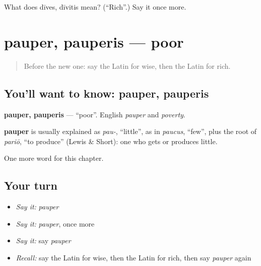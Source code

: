\begin{tcolorbox}[breakable,colback=teal!4,colframe=teal!35!black,title={Before you move on}]
What does dīves, dīvitis mean? (\textquotedblleft{}Rich\textquotedblright{}.) Say it once more.
\end{tcolorbox}
\section[pauper, pauperis]{pauper, pauperis — poor}

\label{lesson:LA-C98-pauper}



\begin{quote}
Before the new one: say the Latin for wise, then the Latin for rich.
\end{quote}

\subsection*{You'll want to know: pauper, pauperis}
\textbf{pauper, pauperis} — \textquotedblleft{}poor\textquotedblright{}. English \emph{pauper} and \emph{poverty}.

\begin{cousinweb}
\textbf{pauper} is usually explained as \emph{pau-}, \textquotedblleft{}little\textquotedblright{}, as in \emph{paucus}, \textquotedblleft{}few\textquotedblright{}, plus the root of \emph{pariō}, \textquotedblleft{}to produce\textquotedblright{} (Lewis \& Short): one who gets or produces little.
\end{cousinweb}

\begin{grammarlens}[title={What you've built}]
One more word for this chapter.
\end{grammarlens}

\subsection*{Your turn}
\begin{itemize}
\raggedright
  \item \emph{Say it:} \emph{pauper}
  \item \emph{Say it:} \emph{pauper}, once more
  \item \emph{Say it:} say \emph{pauper}
  \item \emph{Recall:} say the Latin for wise, then the Latin for rich, then say \emph{pauper} again
\end{itemize}

